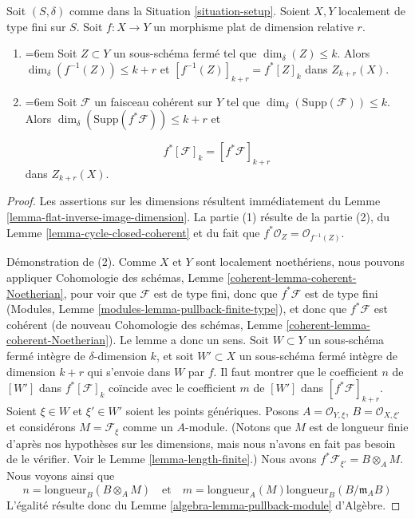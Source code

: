 \begin{lemma}
\label{lemma-pullback-coherent}
Soit $(S, \delta)$ comme dans la Situation \ref{situation-setup}.
Soient $X, Y$ localement de type fini sur $S$.
Soit $f : X \to Y$ un morphisme plat de dimension relative $r$.
\begin{enumerate}
\item {\emergencystretch=6em Soit $Z \subset Y$ un sous-schéma fermé tel que
$\dim_\delta(Z) \leq k$. Alors
$\dim_\delta(f^{-1}(Z)) \leq k + r$
et $[f^{-1}(Z)]_{k + r} = f^*[Z]_k$ dans $Z_{k + r}(X)$.\par}
\item {\emergencystretch=6em Soit $\mathcal{F}$ un faisceau cohérent sur $Y$ tel que
$\dim_\delta(\text{Supp}(\mathcal{F})) \leq k$.
Alors $\dim_\delta(\text{Supp}(f^*\mathcal{F})) \leq k + r$
et\par}
$$
f^*[{\mathcal F}]_k = [f^*{\mathcal F}]_{k+r}
$$
dans $Z_{k + r}(X)$.
\end{enumerate}
\end{lemma}

\begin{proof}
Les assertions sur les dimensions résultent immédiatement du
Lemme \ref{lemma-flat-inverse-image-dimension}.
La partie (1) résulte de la partie (2), du Lemme \ref{lemma-cycle-closed-coherent}
et du fait que $f^*\mathcal{O}_Z = \mathcal{O}_{f^{-1}(Z)}$.

\medskip\noindent
Démonstration de (2).
Comme $X$ et $Y$ sont localement noethériens, nous pouvons appliquer
Cohomologie des schémas, Lemme \ref{coherent-lemma-coherent-Noetherian}, pour voir
que $\mathcal{F}$ est de type fini, donc que $f^*\mathcal{F}$ est
de type fini (Modules, Lemme \ref{modules-lemma-pullback-finite-type}),
et donc que $f^*\mathcal{F}$ est cohérent
(de nouveau Cohomologie des schémas, Lemme \ref{coherent-lemma-coherent-Noetherian}).
Le lemme a donc un sens. Soit $W \subset Y$ un sous-schéma fermé intègre
de $\delta$-dimension $k$, et soit $W' \subset X$ un sous-schéma fermé
intègre de dimension $k + r$ qui s'envoie dans $W$
par $f$. Il faut montrer que le coefficient $n$ de
$[W']$ dans $f^*[{\mathcal F}]_k$ coïncide avec le coefficient
$m$ de $[W']$ dans $[f^*{\mathcal F}]_{k+r}$. Soient $\xi \in W$ et
$\xi' \in W'$ soient les points génériques. Posons
$A = \mathcal{O}_{Y, \xi}$, $B = \mathcal{O}_{X, \xi'}$
et considérons $M = \mathcal{F}_\xi$ comme un $A$-module. (Notons que
$M$ est de longueur finie d'après nos hypothèses sur les dimensions, mais nous
n'avons en fait pas besoin de le vérifier. Voir le
Lemme \ref{lemma-length-finite}.)
Nous avons $f^*\mathcal{F}_{\xi'} = B \otimes_A M$.
Nous voyons ainsi que
$$
n = \text{longueur}_B(B \otimes_A M)
\quad
\text{et}
\quad
m = \text{longueur}_A(M) \text{longueur}_B(B/\mathfrak m_AB)
$$
L'égalité résulte donc du
Lemme \ref{algebra-lemma-pullback-module} d'Algèbre.
\end{proof}



